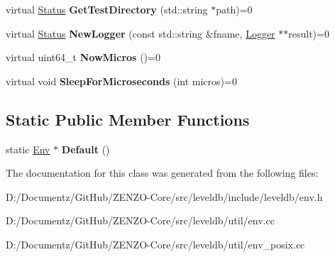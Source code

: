 \begin{DoxyCompactItemize}
\item 
\mbox{\label{classleveldb_1_1_env_ab57a55be37d4d57bf3c0ff83ee689f95}} 
virtual \mbox{\hyperlink{classleveldb_1_1_status}{Status}} {\bfseries Get\+Test\+Directory} (std\+::string $\ast$path)=0
\item 
\mbox{\label{classleveldb_1_1_env_a53a4c41d294fe619f13ec5b697ffc933}} 
virtual \mbox{\hyperlink{classleveldb_1_1_status}{Status}} {\bfseries New\+Logger} (const std\+::string \&fname, \mbox{\hyperlink{classleveldb_1_1_logger}{Logger}} $\ast$$\ast$result)=0
\item 
\mbox{\label{classleveldb_1_1_env_a988062bcd558ac02c62522ac2c8aa39f}} 
virtual uint64\+\_\+t {\bfseries Now\+Micros} ()=0
\item 
\mbox{\label{classleveldb_1_1_env_a43ad838cfb08db3d9e2197800cd33312}} 
virtual void {\bfseries Sleep\+For\+Microseconds} (int micros)=0
\end{DoxyCompactItemize}
\subsection*{Static Public Member Functions}
\begin{DoxyCompactItemize}
\item 
\mbox{\label{classleveldb_1_1_env_ae15b67e650ff6790059745fd1b3bf3e7}} 
static \mbox{\hyperlink{classleveldb_1_1_env}{Env}} $\ast$ {\bfseries Default} ()
\end{DoxyCompactItemize}


The documentation for this class was generated from the following files\+:\begin{DoxyCompactItemize}
\item 
D\+:/\+Documentz/\+Git\+Hub/\+Z\+E\+N\+Z\+O-\/\+Core/src/leveldb/include/leveldb/env.\+h\item 
D\+:/\+Documentz/\+Git\+Hub/\+Z\+E\+N\+Z\+O-\/\+Core/src/leveldb/util/env.\+cc\item 
D\+:/\+Documentz/\+Git\+Hub/\+Z\+E\+N\+Z\+O-\/\+Core/src/leveldb/util/env\+\_\+posix.\+cc\end{DoxyCompactItemize}
